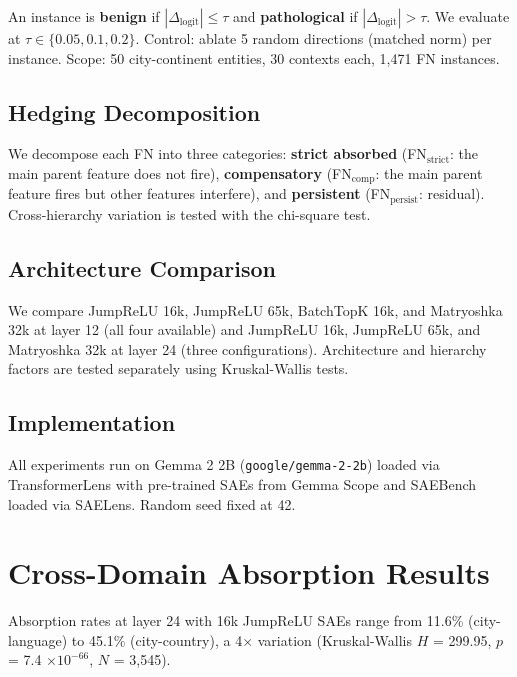 \documentclass{article}
\begin{document}
An instance is \textbf{benign} if $|\Delta_{\text{logit}}| \leq \tau$ and \textbf{pathological} if $|\Delta_{\text{logit}}| > \tau$. We evaluate at $\tau \in \{0.05, 0.1, 0.2\}$. Control: ablate 5 random directions (matched norm) per instance. Scope: 50 city-continent entities, 30 contexts each, 1{,}471 FN instances.

\subsection{Hedging Decomposition}

We decompose each FN into three categories: \textbf{strict absorbed} (FN$_{\text{strict}}$: the main parent feature does not fire), \textbf{compensatory} (FN$_{\text{comp}}$: the main parent feature fires but other features interfere), and \textbf{persistent} (FN$_{\text{persist}}$: residual). Cross-hierarchy variation is tested with the chi-square test.

\subsection{Architecture Comparison}

We compare JumpReLU 16k, JumpReLU 65k, BatchTopK 16k, and Matryoshka 32k at layer 12 (all four available) and JumpReLU 16k, JumpReLU 65k, and Matryoshka 32k at layer 24 (three configurations). Architecture and hierarchy factors are tested separately using Kruskal-Wallis tests.

\subsection{Implementation}

All experiments run on Gemma 2 2B (\texttt{google/gemma-2-2b}) loaded via TransformerLens with pre-trained SAEs from Gemma Scope and SAEBench loaded via SAELens. Random seed fixed at 42.

\section{Cross-Domain Absorption Results}
\label{sec:results}

Absorption rates at layer 24 with 16k JumpReLU SAEs range from 11.6\% (city-language) to 45.1\% (city-country), a 4$\times$ variation (Kruskal-Wallis $H$ = 299.95, $p$ = 7.4 $\times 10^{-66}$, $N$ = 3{,}545).
\end{document}
